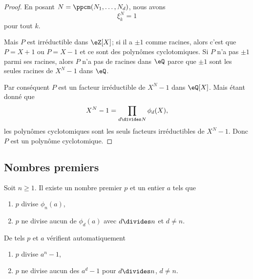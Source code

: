 \begin{proof}
	En posant \( N=\ppcm(N_1,\ldots, N_d)\), nous avons
	\begin{equation}
		\xi_k^N=1
	\end{equation}
	pour tout \( k\).

	Mais \( P\) est irréductible dans \( \eZ[X]\); si il a \( \pm 1\) comme racines, alors c'est que \( P=X+1\) ou \( P=X-1\) et ce sont des polynômes cyclotomiques. Si \( P\) n'a pas \( \pm 1\) parmi ses racines, alors \( P\) n'a pas de racines dans \( \eQ\) parce que \( \pm 1\) sont les seules racines de \( X^N-1\) dans \( \eQ\).

	Par conséquent \( P\) est un facteur irréductible de \( X^N-1\) dans \( \eQ[X]\). Mais étant donné que
	\begin{equation}
		X^N-1=\prod_{d\divides N}\phi_d(X),
	\end{equation}
	les polynômes cyclotomiques sont les seuls facteurs irréductibles de \( X^N-1\). Donc \( P\) est un polynôme cyclotomique.
\end{proof}

\subsection{Nombres premiers}

\begin{lemma}    \label{LemiAqLEn}
	Soit \( n\geq 1\). Il existe un nombre premier \( p\) et un entier \( a\) tels que
	\begin{enumerate}
		\item
		      \( p\) divise \( \phi_n(a)\),
		\item
		      \( p\) ne divise aucun de \( \phi_d(a)\) avec \( d\divides n\) et \( d\neq n\).
	\end{enumerate}
	De tels \( p\) et \( a\) vérifient automatiquement
	\begin{enumerate}
		\item
		      \( p\) divise \( a^n-1\),
		\item
		      \( p\) ne divise aucun des \( a^d-1\) pour \( d\divides n\), \( d\neq n\).
	\end{enumerate}
\end{lemma}

